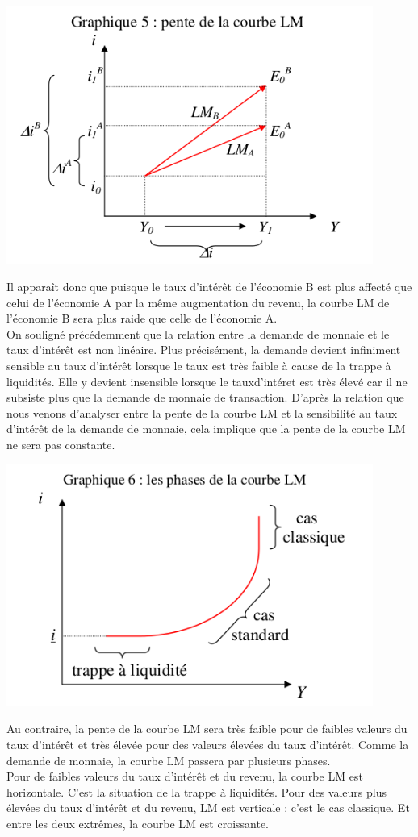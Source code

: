 \documentclass[10pt]{book}
\begin{document}
\begin{center}
  \includegraphics[width=12cm]{graph29.png}
\end{center}
Il apparaît donc que puisque le taux d'intérêt de l'économie B est plus affecté que celui de l'économie A par la même augmentation du revenu, la courbe LM de l'économie B sera plus raide que celle de l'économie A. \\
On souligné précédemment que la relation entre la demande de monnaie et le taux d'intérêt est non linéaire. Plus précisément, la demande devient infiniment sensible au taux d'intérêt lorsque le taux est très faible à cause de la trappe à liquidités. Elle y devient insensible lorsque le tauxd'intéret est très élevé car il ne subsiste plus que la demande de monnaie de transaction. D'après la relation que nous venons d'analyser entre la pente de la courbe LM et la sensibilité au taux d'intérêt de la demande de monnaie, cela implique que la pente de la courbe LM ne sera pas constante.
\begin{center}
  \includegraphics[width=12cm]{graph30.png}
\end{center}
Au contraire, la pente de la courbe LM sera très faible pour de faibles valeurs du taux d'intérêt et très élevée pour des valeurs élevées du taux d'intérêt. Comme la demande de monnaie, la courbe LM passera par plusieurs phases. \\
Pour de faibles valeurs du taux d'intérêt et du revenu, la courbe LM est horizontale. C'est la situation de la trappe à liquidités. Pour des valeurs plus élevées du taux d'intérêt et du revenu, LM est verticale : c'est le cas classique. Et entre les deux extrêmes, la courbe LM est croissante. \\
\end{document}
